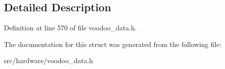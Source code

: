 \subsection{Detailed Description}


Definition at line 570 of file voodoo\-\_\-data.\-h.



The documentation for this struct was generated from the following file\-:\begin{DoxyCompactItemize}
\item 
src/hardware/voodoo\-\_\-data.\-h\end{DoxyCompactItemize}
